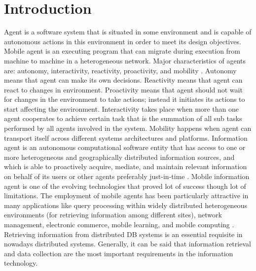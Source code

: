 \documentclass[12pt,a4paper,final,twoside,onecolumn,titlepage]{book}
\begin{document}
\section{Introduction}
Agent is a software system that is situated in some environment and is capable of autonomous actions in this environment in order to meet its design objectives. Mobile agent is an executing program that can migrate during execution from machine to machine in a heterogeneous network. Major characteristics of agents are: autonomy, interactivity, reactivity, proactivity, and mobility \cite{BS37, MNAS02,MNAS03}. Autonomy means that agent can make its own decisions. Reactivity means that agent can react to changes in environment. Proactivity means that agent should not wait for changes in the environment to take actions; instead it initiates its actions to start affecting the environment. Interactivity takes place when more than one agent cooperates to achieve certain task that is the summation of all sub tasks performed by all agents involved in the system. Mobility happens when agent can transport itself across different systems architectures and platforms. Information agent is an autonomous computational software entity that has access to one or more heterogeneous and geographically distributed information sources, and which is able to proactively acquire, mediate, and maintain relevant information on behalf of its users or other agents preferably just-in-time \cite{BS37}. Mobile information agent is one of the evolving technologies that proved lot of success though lot of limitations. The employment of mobile agents has been particularly attractive in many applications like query processing within widely distributed heterogeneous environments (for retrieving information among different sites), network management, electronic commerce, mobile learning, and mobile computing \cite{MNAS04, MNAS05, MNAS06, MNAS07, MNAS08}. Retrieving information from distributed \gls{DB} systems is an essential requisite in nowadays distributed systems. Generally, it can be said that information retrieval and data collection are the most important requirements in the information technology. 
\end{document}
